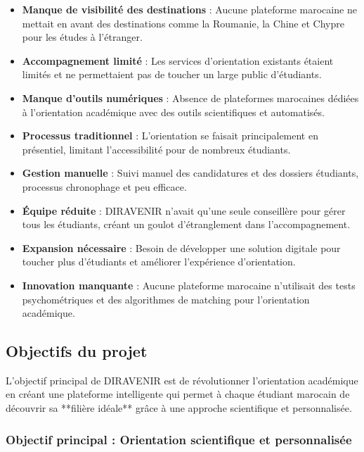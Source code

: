 \documentclass[12pt,a4paper]{report}
\begin{document}
\begin{itemize}
    \item \textbf{Manque de visibilité des destinations} : Aucune plateforme marocaine ne mettait en avant des destinations comme la Roumanie, la Chine et Chypre pour les études à l'étranger.
    
    \item \textbf{Accompagnement limité} : Les services d'orientation existants étaient limités et ne permettaient pas de toucher un large public d'étudiants.
    
    \item \textbf{Manque d'outils numériques} : Absence de plateformes marocaines dédiées à l'orientation académique avec des outils scientifiques et automatisés.
    
    \item \textbf{Processus traditionnel} : L'orientation se faisait principalement en présentiel, limitant l'accessibilité pour de nombreux étudiants.
    
    \item \textbf{Gestion manuelle} : Suivi manuel des candidatures et des dossiers étudiants, processus chronophage et peu efficace.
    
    \item \textbf{Équipe réduite} : DIRAVENIR n'avait qu'une seule conseillère pour gérer tous les étudiants, créant un goulot d'étranglement dans l'accompagnement.
    
    \item \textbf{Expansion nécessaire} : Besoin de développer une solution digitale pour toucher plus d'étudiants et améliorer l'expérience d'orientation.
    
    \item \textbf{Innovation manquante} : Aucune plateforme marocaine n'utilisait des tests psychométriques et des algorithmes de matching pour l'orientation académique.
\end{itemize}

\subsection{Objectifs du projet}

L'objectif principal de DIRAVENIR est de révolutionner l'orientation académique en créant une plateforme intelligente qui permet à chaque étudiant marocain de découvrir sa **filière idéale** grâce à une approche scientifique et personnalisée.

\subsubsection{Objectif principal : Orientation scientifique et personnalisée}
\end{document}
